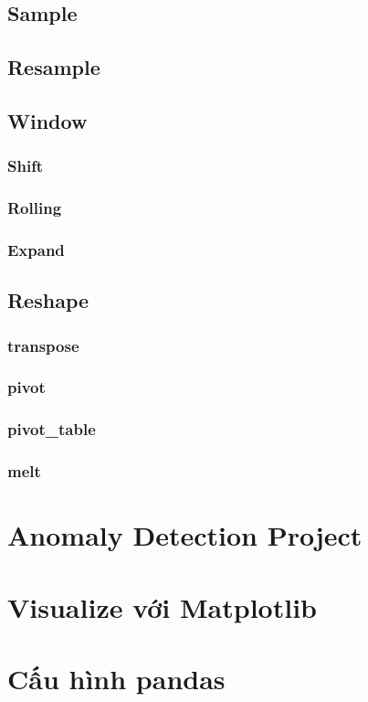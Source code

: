 \documentclass[
]{book}
\begin{document}
\section{Sample}\label{sample}

\section{Resample}\label{resample}

\section{Window}\label{window}

\subsection{Shift}\label{shift}

\subsection{Rolling}\label{rolling}

\subsection{Expand}\label{expand}

\section{Reshape}\label{reshape}

\subsection{transpose}\label{transpose}

\subsection{pivot}\label{pivot}

\subsection{pivot\_table}\label{pivot_table}

\subsection{melt}\label{melt}

\chapter{Anomaly Detection Project}\label{anomaly-detection-project}

\chapter{Visualize với Matplotlib}\label{visualize-vux1edbi-matplotlib}

\chapter{Cấu hình pandas}\label{cux1ea5u-huxecnh-pandas}

\printindex
\end{document}
